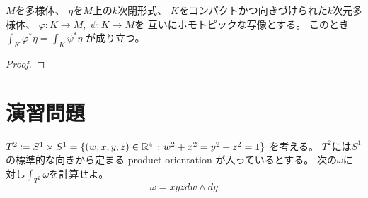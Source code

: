 \documentclass[report]{jlreq}
\begin{document}
\begin{proposition}
    $M$を多様体、
    $\eta$を$M$上の$k$次閉形式、
    $K$をコンパクトかつ向きづけられた$k$次元多様体、
    $\varphi \colon K \to M, \; \psi \colon K \to M$を
    互いに{\smooth}ホモトピックな{\smooth}写像とする。
    このとき
    $\int_K \varphi^* \eta = \int_K \psi^* \eta$
    が成り立つ。
\end{proposition}

\begin{proof}
    \TODO{}
\end{proof}



%
\section{演習問題}

\begin{problem}[{[Lee] 16-2}]
    $T^2 \coloneqq S^1 \times S^1 = \{ (w, x, y, z) \in \mathbb{R}^4\ \colon w^2 + x^2 = y^2 + z^2 = 1 \}$
    を考える。
    $T^2$には$S^1$の標準的な向きから定まる product orientation が入っているとする。
    次の$\omega$に対し$\int_{T^2} \omega$を計算せよ。
    \begin{equation}
        \omega = xyz dw \wedge dy
    \end{equation}
\end{problem}
\end{document}
